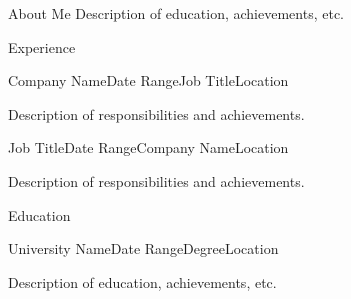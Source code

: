 \documentclass{resume}
\begin{document}
\begin{rSection}{About Me}
  Description of education, achievements, etc.
\end{rSection}

\begin{rSection}{Experience}

\begin{rSubsection}{Company Name}{Date Range}{Job Title}{Location}
  \item Description of responsibilities and achievements.
\end{rSubsection}

\begin{rSubsection}{Job Title}{Date Range}{Company Name}{Location}
  \item Description of responsibilities and achievements.
\end{rSubsection}

\end{rSection}

\begin{rSection}{Education}
  \begin{rSubsection}{University Name}{Date Range}{Degree}{Location}
    \item Description of education, achievements, etc.
  \end{rSubsection}
\end{rSection}
\end{document}
